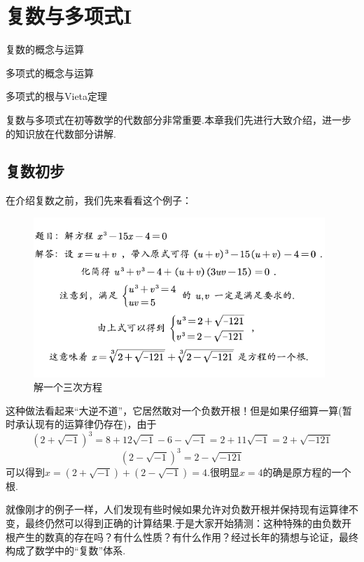 \documentclass[lang=cn, zihao=5]{elegantbook}
\begin{document}
\chapter{复数与多项式I}

\begin{introduction}
	\item 复数的概念与运算
	\item 多项式的概念与运算
	\item 多项式的根与Vieta定理
\end{introduction}

复数与多项式在初等数学的代数部分非常重要.本章我们先进行大致介绍，进一步的知识放在代数部分讲解.

\section{复数初步}

在介绍复数之前，我们先来看看这个例子：

\begin{figure}[H]
	\centering
	\includegraphics[width=11cm]{attachment/202304152fuuu.pdf}
	\caption{解一个三次方程}
\end{figure}

这种做法看起来“大逆不道”，它居然敢对一个负数开根！但是如果仔细算一算(暂时承认现有的运算律仍存在)，由于
$$(2+\sqrt{-1})^3 = 8 + 12\sqrt{-1} - 6 - \sqrt{-1} = 2+11\sqrt{-1}=2+\sqrt{-121}$$
$$(2-\sqrt{-1})^3 = 2-\sqrt{-121}$$
可以得到$x=(2+\sqrt{-1})+(2-\sqrt{-1})=4$.很明显$x=4$的确是原方程的一个根.

就像刚才的例子一样，人们发现有些时候如果允许对负数开根并保持现有运算律不变，最终仍然可以得到正确的计算结果.于是大家开始猜测：这种特殊的由负数开根产生的数真的存在吗？有什么性质？有什么作用？经过长年的猜想与论证，最终构成了数学中的“复数”体系.
\end{document}
